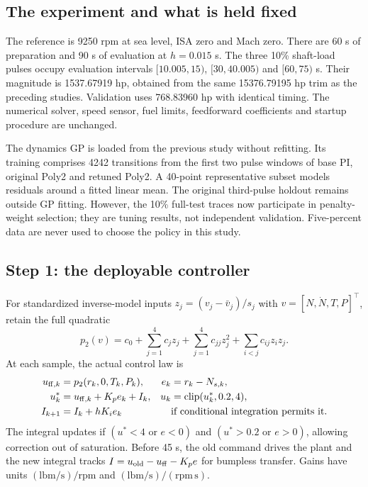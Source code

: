 \subsection{The experiment and what is held fixed}
The reference is 9250 rpm at sea level, ISA zero and Mach zero. There are 60 s of preparation and 90 s of evaluation at $h=0.015$ s. The three 10\% shaft-load pulses occupy evaluation intervals $[10.005,15)$, $[30,40.005)$ and $[60,75)$ s. Their magnitude is 1537.67919 hp, obtained from the same 15376.79195 hp trim as the preceding studies. Validation uses 768.83960 hp with identical timing. The numerical solver, speed sensor, fuel limits, feedforward coefficients and startup procedure are unchanged.

The dynamics GP is loaded from the previous study without refitting. Its training comprises 4242 transitions from the first two pulse windows of base PI, original Poly2 and retuned Poly2. A 40-point representative subset models residuals around a fitted linear mean. The original third-pulse holdout remains outside GP fitting. However, the 10\% full-test traces now participate in penalty-weight selection; they are tuning results, not independent validation. Five-percent data are never used to choose the policy in this study.

\subsection{Step 1: the deployable controller}
For standardized inverse-model inputs $z_j=(v_j-\bar v_j)/s_j$ with $v=[N,\dot N,T,P]^\top$, retain the full quadratic
\begin{equation}
p_2(v)=c_0+\sum_{j=1}^4c_jz_j+\sum_{j=1}^4c_{jj}z_j^2+\sum_{i<j}c_{ij}z_iz_j.
\end{equation}
At each sample, the actual control law is
\begin{align}
u_{{\rm ff},k}&=p_2(r_k,0,T_k,P_k),& e_k&=r_k-N_{s,k},\\
u_k^*&=u_{{\rm ff},k}+K_pe_k+I_k,&u_k&=\operatorname{clip}(u_k^*,0.2,4),\\
I_{k+1}&=I_k+hK_ie_k&&\text{if conditional integration permits it.}
\end{align}
The integral updates if $(u^*<4\text{ or }e<0)$ and $(u^*>0.2\text{ or }e>0)$, allowing correction out of saturation. Before 45 s, the old command drives the plant and the new integral tracks $I=u_{\rm old}-u_{\rm ff}-K_pe$ for bumpless transfer. Gains have units $(\mathrm{lbm/s})/\mathrm{rpm}$ and $(\mathrm{lbm/s})/(\mathrm{rpm\,s})$.

